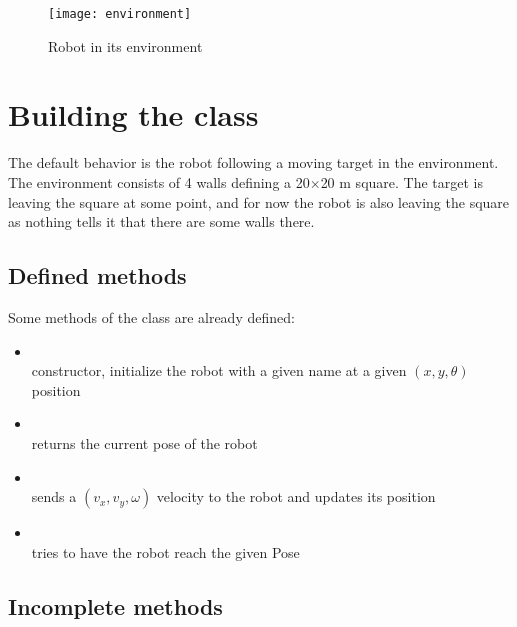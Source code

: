 \documentclass{ecnreport}
\begin{document}
\newpage

\begin{figure}\centering
\texttt{[image: environment]}
\caption{\label{fig:envir} Robot in its environment}
\end{figure}


\section{Building the  class}

The default behavior is the robot following a moving target in the environment. The environment consists of 4 walls defining a 20$\times$20 m square. The target is leaving the square at some point, 
and for now the robot is also leaving the square as nothing tells it that there are some walls there.

\subsection{Defined methods}

Some methods of the class are already defined:
\begin{itemize}
 \item {}\\
 constructor, initialize the robot with a given name at a given $(x,y,\theta)$ position
 \item {} \\ returns the current pose of the robot
 \item {}\\
 sends a $(v_x, v_y, \omega)$ velocity to the robot and updates its position
 \item {}\\
 tries to have the robot reach the given Pose
\end{itemize}


\subsection{Incomplete methods}
\end{document}
